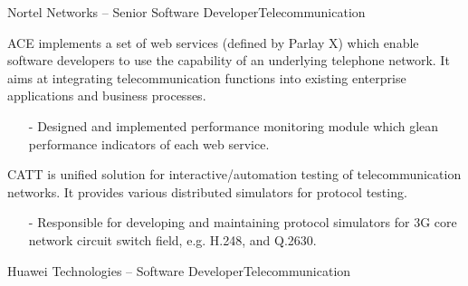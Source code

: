 \documentclass[10pt,a4paper]{moderncv}
\begin{document}
{Nortel Networks -- Senior Software Developer}{Telecommunication}{}{}{}
{
  ACE implements a set of web services (defined by Parlay X) which enable software developers to use the capability of an underlying telephone network. It aims at integrating telecommunication functions into existing enterprise applications and business processes.
  \begin{itemize}
    \item[-] Designed and implemented performance monitoring module which glean performance indicators of each web service.
  \end{itemize}
}
\vspace*{0.4\baselineskip}

\vspace*{0.2\baselineskip}
{
  CATT is unified solution for interactive/automation testing of telecommunication networks. It provides various distributed simulators for protocol testing.
  \begin{itemize}
    \item[-] Responsible for developing and maintaining protocol simulators for 3G core network circuit switch field, e.g. H.248, and Q.2630.
  \end{itemize}
}

\vspace*{0.2\baselineskip}
\vspace*{0.2\baselineskip}
\vspace*{0.4\baselineskip}
{Huawei Technologies -- Software Developer}{Telecommunication}{}{}{}
\end{document}
